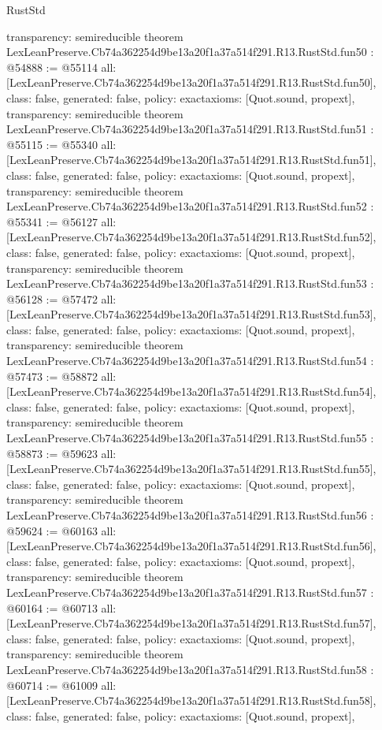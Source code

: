 \begin{lexlean}{RustStd}
\begin{coremodule}
{  transparency: semireducible
}
theorem LexLeanPreserve.Cb74a362254d9be13a20f1a37a514f291.R13.RustStd.fun50 : @54888 := @55114 {
  all: [LexLeanPreserve.Cb74a362254d9be13a20f1a37a514f291.R13.RustStd.fun50],
  class: false,
  generated: false,
  policy: exact{axioms: [Quot.sound, propext]},
  transparency: semireducible
}
theorem LexLeanPreserve.Cb74a362254d9be13a20f1a37a514f291.R13.RustStd.fun51 : @55115 := @55340 {
  all: [LexLeanPreserve.Cb74a362254d9be13a20f1a37a514f291.R13.RustStd.fun51],
  class: false,
  generated: false,
  policy: exact{axioms: [Quot.sound, propext]},
  transparency: semireducible
}
theorem LexLeanPreserve.Cb74a362254d9be13a20f1a37a514f291.R13.RustStd.fun52 : @55341 := @56127 {
  all: [LexLeanPreserve.Cb74a362254d9be13a20f1a37a514f291.R13.RustStd.fun52],
  class: false,
  generated: false,
  policy: exact{axioms: [Quot.sound, propext]},
  transparency: semireducible
}
theorem LexLeanPreserve.Cb74a362254d9be13a20f1a37a514f291.R13.RustStd.fun53 : @56128 := @57472 {
  all: [LexLeanPreserve.Cb74a362254d9be13a20f1a37a514f291.R13.RustStd.fun53],
  class: false,
  generated: false,
  policy: exact{axioms: [Quot.sound, propext]},
  transparency: semireducible
}
theorem LexLeanPreserve.Cb74a362254d9be13a20f1a37a514f291.R13.RustStd.fun54 : @57473 := @58872 {
  all: [LexLeanPreserve.Cb74a362254d9be13a20f1a37a514f291.R13.RustStd.fun54],
  class: false,
  generated: false,
  policy: exact{axioms: [Quot.sound, propext]},
  transparency: semireducible
}
theorem LexLeanPreserve.Cb74a362254d9be13a20f1a37a514f291.R13.RustStd.fun55 : @58873 := @59623 {
  all: [LexLeanPreserve.Cb74a362254d9be13a20f1a37a514f291.R13.RustStd.fun55],
  class: false,
  generated: false,
  policy: exact{axioms: [Quot.sound, propext]},
  transparency: semireducible
}
theorem LexLeanPreserve.Cb74a362254d9be13a20f1a37a514f291.R13.RustStd.fun56 : @59624 := @60163 {
  all: [LexLeanPreserve.Cb74a362254d9be13a20f1a37a514f291.R13.RustStd.fun56],
  class: false,
  generated: false,
  policy: exact{axioms: [Quot.sound, propext]},
  transparency: semireducible
}
theorem LexLeanPreserve.Cb74a362254d9be13a20f1a37a514f291.R13.RustStd.fun57 : @60164 := @60713 {
  all: [LexLeanPreserve.Cb74a362254d9be13a20f1a37a514f291.R13.RustStd.fun57],
  class: false,
  generated: false,
  policy: exact{axioms: [Quot.sound, propext]},
  transparency: semireducible
}
theorem LexLeanPreserve.Cb74a362254d9be13a20f1a37a514f291.R13.RustStd.fun58 : @60714 := @61009 {
  all: [LexLeanPreserve.Cb74a362254d9be13a20f1a37a514f291.R13.RustStd.fun58],
  class: false,
  generated: false,
  policy: exact{axioms: [Quot.sound, propext]},
}
\end{coremodule}
\end{lexlean}
